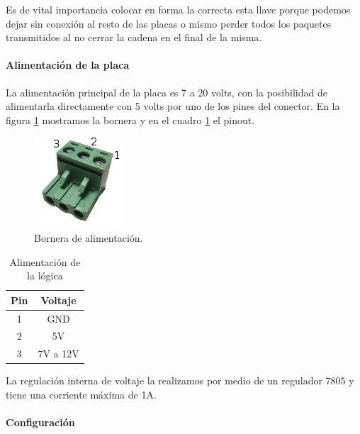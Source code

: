 Es de vital importancia colocar en forma la correcta esta llave porque podemos dejar sin conexi\'on al resto de las placas o mismo
perder todos los paquetes transmitidos al no cerrar la cadena en el final de la misma.

\paragraph{Alimentaci\'on de la placa}
\label{h_placas_generica_alimentacion}

La alimentaci\'on principal de la placa es 7 a 20 volts, con la posibilidad de alimentarla directamente con 5 volts
por uno de los pines del conector.
En la figura \ref{hF_placa_gen_borneras} mostramos la bornera y en el cuadro \ref{hT_placa_gen_alimentacion} el pinout.

\begin{figure}[h]
	\centering
	\includegraphics[scale=.3]{figuras/bornera3.png}
	\caption{Bornera de alimentaci\'on.}
	\label{hF_placa_gen_borneras}
\end{figure}

\begin{table}
	\begin{center}
		\begin{tabular}{|c|c|}
			\hline
			Pin & Voltaje \\
			\hline
			1 & GND \\
			\hline
			2 & 5V \\
			\hline
			3 & 7V a 12V \\
			\hline
		\end{tabular}
		\caption{Alimentaci\'on de la l\'ogica}
		\label{hT_placa_gen_alimentacion}
	\end{center}
\end{table}

La regulaci\'on interna de voltaje la realizamos por medio de un regulador 7805 y tiene una corriente m\'axima de 1A.

\paragraph{Configuraci\'on}
\label{h_placas_generica_config}

